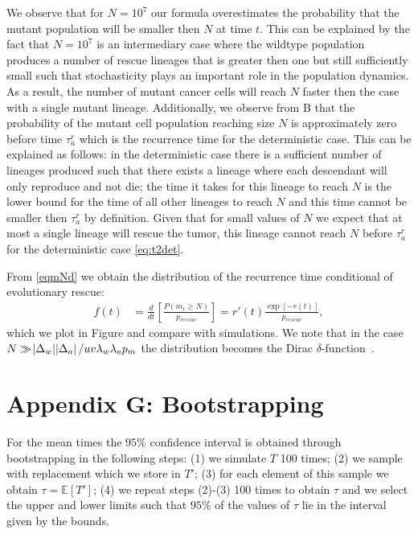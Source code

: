 \documentclass[12pt]{extarticle}
\begin{document}
\begin{appendices}
We observe that for $N=10^7$ our formula overestimates the probability that the mutant population will be smaller then $N$ at time $t$.  This can be explained by the fact that $N=10^7$ is an intermediary case where the wildtype population produces a number of rescue lineages that is greater then one but still sufficiently small such that stochasticity plays an important role in the population dynamics. As a result, the number of mutant cancer cells will reach $N$ faster then the case with a single mutant lineage. Additionally, we observe from B that the probability of the mutant cell population reaching size $N$ is approximately zero before time $\tau_a^r$ which is the recurrence time for the deterministic case. This can be explained as follows: in the deterministic case there is a sufficient number of lineages produced such that there exists a lineage where each descendant will only reproduce and not die; the time it takes for this lineage to reach $N$ is the lower bound for the time of all other lineages to reach $N$ and this time cannot be smaller then $\tau_a^r$ by definition. Given that for small values of $N$ we expect that at most a single lineage will rescue the tumor, this lineage cannot reach $N$ before $\tau_a^r$ for the deterministic case \cref{eq:t2det}.

From  \cref{eqmNd} we obtain the distribution of the recurrence time conditional of evolutionary rescue:
\begin{align}\label{distribution}
f\left(t\right)&=\frac{d}{dt}\left[\frac{P\left(m_t\geq N\right)}{p_{rescue}}\right]=r'\left(t\right)\frac{\exp\left[-r\left(t\right)\right]}{p_{rescue}},
\end{align}
which we plot in Figure and compare with simulations. We note that in the case $N\gg\abs{\Delta_w}\abs{\Delta_a}/uv\lambda_w\lambda_ap_m$ the distribution becomes the Dirac $\delta$-function~\citep{barton1989elements}.
\section*{Appendix G: Bootstrapping}
For the mean times the $95\%$ confidence interval is obtained through bootstrapping in the following steps: (1) we simulate $T$ 100 times; (2) we sample with replacement which we store in $T'$; (3) for each element of this sample we obtain $\tau=\mathbb{E}\left[T'\right]$; (4) we repeat steps (2)-(3) 100 times to obtain $\tau$ and we select the upper and lower limits such that $95\%$ of the values of $\tau$ lie in the interval given by the bounds.


\end{appendices}
\end{document}
